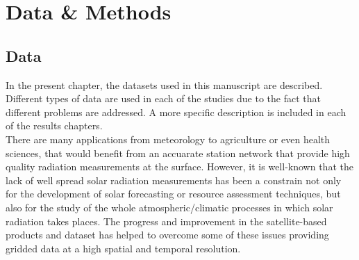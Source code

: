 \part{Data \& Methods\label{cha:data}}

  
\chapter{Data\label{cha:Data}}

  In the present chapter, the datasets used in this manuscript are described. Different types of data are used in each of the studies due to the fact that different problems are addressed. A more specific description is included in each of the results chapters.\\

  There are many applications from meteorology to agriculture or even health sciences, that would benefit from an accuarate station network that provide high quality radiation measurements at the surface. However, it is well-known that the lack of  well spread solar radiation measurements has been a constrain not only for the development of solar forecasting or resource assessment techniques, but also for the study of the whole atmospheric/climatic processes in which solar radiation takes places. The progress and improvement in the satellite-based products and dataset has helped to overcome some of these issues providing gridded data at a high spatial and temporal resolution.\\

  
